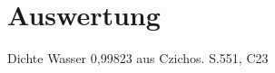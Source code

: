 \section{Auswertung}
\label{sec:Auswertung}



Dichte Wasser 0,99823 aus Czichos. S.551, C23 \cite{czichos}
